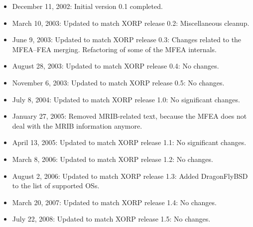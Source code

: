 \documentclass[11pt]{article}
\begin{document}
\begin{itemize}

  \item December 11, 2002: Initial version 0.1 completed.

  \item March 10, 2003: Updated to match XORP release 0.2:
   Miscellaneous cleanup.

  \item June 9, 2003: Updated to match XORP release 0.3:
   Changes related to the MFEA--FEA merging. Refactoring of
   some of the MFEA internals.

  \item August 28, 2003: Updated to match XORP release 0.4:
   No changes.

  \item November 6, 2003: Updated to match XORP release 0.5:
   No changes.

  \item July 8, 2004: Updated to match XORP release 1.0:
   No significant changes.

  \item January 27, 2005: Removed MRIB-related text, because the MFEA
  does not deal with the MRIB information anymore.

  \item April 13, 2005: Updated to match XORP release 1.1:
   No significant changes.

  \item March 8, 2006: Updated to match XORP release 1.2:
   No changes.

  \item August 2, 2006: Updated to match XORP release 1.3:
   Added DragonFlyBSD to the list of supported OSs.

  \item March 20, 2007: Updated to match XORP release 1.4:
   No changes.

  \item July 22, 2008: Updated to match XORP release 1.5:
   No changes.

\end{itemize}





\end{document}
